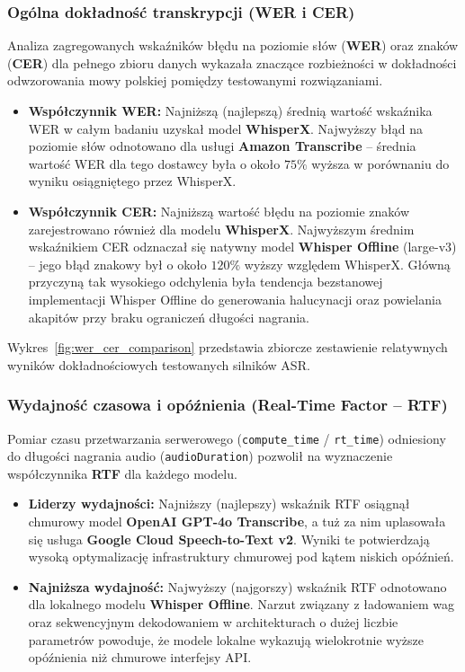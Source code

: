 \subsubsection{Ogólna dokładność transkrypcji (WER i CER)}
\label{subsubsec:overall_accuracy}

Analiza zagregowanych wskaźników błędu na poziomie słów (\textbf{WER}) oraz znaków (\textbf{CER}) dla pełnego zbioru danych wykazała znaczące rozbieżności w dokładności odwzorowania mowy polskiej pomiędzy testowanymi rozwiązaniami.

\begin{itemize}
    \item \textbf{Współczynnik WER:} Najniższą (najlepszą) średnią wartość wskaźnika WER w całym badaniu uzyskał model \textbf{WhisperX}. Najwyższy błąd na poziomie słów odnotowano dla usługi \textbf{Amazon Transcribe} – średnia wartość WER dla tego dostawcy była o około $75\%$ wyższa w porównaniu do wyniku osiągniętego przez WhisperX.
    \item \textbf{Współczynnik CER:} Najniższą wartość błędu na poziomie znaków zarejestrowano również dla modelu \textbf{WhisperX}. Najwyższym średnim wskaźnikiem CER odznaczał się natywny model \textbf{Whisper Offline} (large-v3) – jego błąd znakowy był o około $120\%$ wyższy względem WhisperX. Główną przyczyną tak wysokiego odchylenia była tendencja bezstanowej implementacji Whisper Offline do generowania halucynacji oraz powielania akapitów przy braku ograniczeń długości nagrania.
\end{itemize}

Wykres~\ref{fig:wer_cer_comparison} przedstawia zbiorcze zestawienie relatywnych wyników dokładnościowych testowanych silników ASR.




\subsubsection{Wydajność czasowa i opóźnienia (Real-Time Factor -- RTF)}
\label{subsubsec:performance_rtf}

Pomiar czasu przetwarzania serwerowego (\texttt{compute\_time} / \texttt{rt\_time}) odniesiony do długości nagrania audio (\texttt{audioDuration}) pozwolił na wyznaczenie współczynnika \textbf{RTF} dla każdego modelu.

\begin{itemize}
    \item \textbf{Liderzy wydajności:} Najniższy (najlepszy) wskaźnik RTF osiągnął chmurowy model \textbf{OpenAI GPT-4o Transcribe}, a tuż za nim uplasowała się usługa \textbf{Google Cloud Speech-to-Text v2}. Wyniki te potwierdzają wysoką optymalizację infrastruktury chmurowej pod kątem niskich opóźnień.
    \item \textbf{Najniższa wydajność:} Najwyższy (najgorszy) wskaźnik RTF odnotowano dla lokalnego modelu \textbf{Whisper Offline}. Narzut związany z ładowaniem wag oraz sekwencyjnym dekodowaniem w architekturach o dużej liczbie parametrów powoduje, że modele lokalne wykazują wielokrotnie wyższe opóźnienia niż chmurowe interfejsy API.
\end{itemize}

